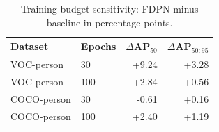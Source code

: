 \begin{table}[!htbp]
\centering
\caption{Training-budget sensitivity: FDPN minus baseline in percentage points.}
\label{tab:budget_sensitivity}
\footnotesize
\setlength{\tabcolsep}{5pt}
\begin{tabular}{llrr}
\toprule
Dataset & Epochs & $\Delta$AP$_{50}$ & $\Delta$AP$_{50:95}$\\
\midrule
VOC-person & 30 & +9.24 & +3.28\\
VOC-person & 100 & +2.84 & +0.56\\
COCO-person & 30 & -0.61 & +0.16\\
COCO-person & 100 & +2.40 & +1.19\\
\bottomrule
\end{tabular}
\end{table}

